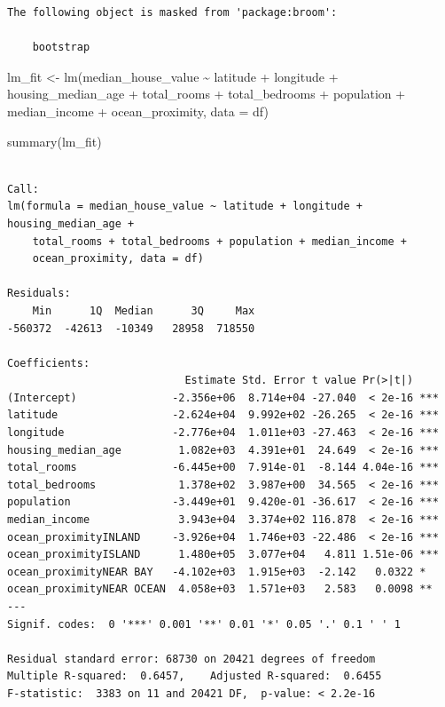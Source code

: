 \documentclass[
  letterpaper,
  DIV=11,
  numbers=noendperiod]{scrartcl}
\newenvironment{Shaded}{\begin{snugshade}}{\end{snugshade}}
\newcommand{\AttributeTok}[1]{\textcolor[rgb]{0.40,0.45,0.13}{#1}}
\newcommand{\FunctionTok}[1]{\textcolor[rgb]{0.28,0.35,0.67}{#1}}
\newcommand{\NormalTok}[1]{\textcolor[rgb]{0.00,0.23,0.31}{#1}}
\newcommand{\OtherTok}[1]{\textcolor[rgb]{0.00,0.23,0.31}{#1}}
\newcommand{\SpecialCharTok}[1]{\textcolor[rgb]{0.37,0.37,0.37}{#1}}
\begin{document}
\begin{verbatim}
The following object is masked from 'package:broom':

    bootstrap
\end{verbatim}

\begin{Shaded}
\begin{Highlighting}[]
\NormalTok{lm\_fit }\OtherTok{\textless{}{-}} \FunctionTok{lm}\NormalTok{(median\_house\_value }\SpecialCharTok{\textasciitilde{}}\NormalTok{ latitude }\SpecialCharTok{+}\NormalTok{ longitude }\SpecialCharTok{+}\NormalTok{ housing\_median\_age }\SpecialCharTok{+} 
\NormalTok{              total\_rooms }\SpecialCharTok{+}\NormalTok{ total\_bedrooms }\SpecialCharTok{+}\NormalTok{ population }\SpecialCharTok{+}\NormalTok{ median\_income }\SpecialCharTok{+} 
\NormalTok{              ocean\_proximity, }\AttributeTok{data =}\NormalTok{ df)}

\FunctionTok{summary}\NormalTok{(lm\_fit)}
\end{Highlighting}
\end{Shaded}

\begin{verbatim}

Call:
lm(formula = median_house_value ~ latitude + longitude + housing_median_age + 
    total_rooms + total_bedrooms + population + median_income + 
    ocean_proximity, data = df)

Residuals:
    Min      1Q  Median      3Q     Max 
-560372  -42613  -10349   28958  718550 

Coefficients:
                            Estimate Std. Error t value Pr(>|t|)    
(Intercept)               -2.356e+06  8.714e+04 -27.040  < 2e-16 ***
latitude                  -2.624e+04  9.992e+02 -26.265  < 2e-16 ***
longitude                 -2.776e+04  1.011e+03 -27.463  < 2e-16 ***
housing_median_age         1.082e+03  4.391e+01  24.649  < 2e-16 ***
total_rooms               -6.445e+00  7.914e-01  -8.144 4.04e-16 ***
total_bedrooms             1.378e+02  3.987e+00  34.565  < 2e-16 ***
population                -3.449e+01  9.420e-01 -36.617  < 2e-16 ***
median_income              3.943e+04  3.374e+02 116.878  < 2e-16 ***
ocean_proximityINLAND     -3.926e+04  1.746e+03 -22.486  < 2e-16 ***
ocean_proximityISLAND      1.480e+05  3.077e+04   4.811 1.51e-06 ***
ocean_proximityNEAR BAY   -4.102e+03  1.915e+03  -2.142   0.0322 *  
ocean_proximityNEAR OCEAN  4.058e+03  1.571e+03   2.583   0.0098 ** 
---
Signif. codes:  0 '***' 0.001 '**' 0.01 '*' 0.05 '.' 0.1 ' ' 1

Residual standard error: 68730 on 20421 degrees of freedom
Multiple R-squared:  0.6457,    Adjusted R-squared:  0.6455 
F-statistic:  3383 on 11 and 20421 DF,  p-value: < 2.2e-16
\end{verbatim}
\end{document}
